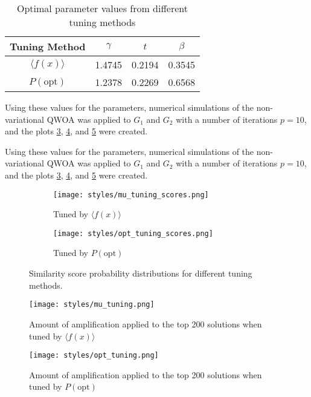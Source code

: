 \begin{table}[ht]
    \centering
    \begin{tabular}{|c|c|c|c|}
        \hline
        Tuning Method & $\gamma$ & $t$ & $\beta$\\
        \hline
        $\langle f(x)\rangle$ & 1.4745 & 0.2194 & 0.3545\\
        \hline
        $P(\text{opt})$ & 1.2378 & 0.2269 & 0.6568\\
        \hline
    \end{tabular}
    \caption{Optimal parameter values from different tuning methods }
    \label{table:1}
\end{table}

Using these values for the parameters, numerical simulations of the non-variational QWOA was applied to $G_{1}$ and $G_{2}$ with a number of iterations $p=10$, and the plots \ref{fig:image1}, \ref{fig:image2}, and \ref{fig:image3} were created.

Using these values for the parameters, numerical simulations of the non-variational QWOA was applied to $G_{1}$ and $G_{2}$ with a number of iterations $p=10$, and the plots \ref{fig:image1}, \ref{fig:image2}, and \ref{fig:image3} were created.

\begin{figure}[ht]
\begin{subfigure}{0.45\textwidth}
\texttt{[image: styles/mu\_tuning\_scores.png]} 
\caption{Tuned by $\langle f(x)\rangle$}
\label{fig:subim1}
\end{subfigure}
\begin{subfigure}{0.45\textwidth}
\texttt{[image: styles/opt\_tuning\_scores.png]}
\caption{Tuned by $P(\text{opt})$}
\label{fig:subim2}
\end{subfigure}
\caption{Similarity score probability distributions for different tuning methods.}
\label{fig:image1}
\end{figure}


\begin{figure}[ht]
\texttt{[image: styles/mu\_tuning.png]} 
\caption{Amount of amplification applied to the top 200 solutions when tuned by $\langle f(x)\rangle$}
\label{fig:image2}
\end{figure}

\begin{figure}[ht]
\texttt{[image: styles/opt\_tuning.png]}
\caption{Amount of amplification applied to the top 200 solutions when tuned by $P(\text{opt})$}
\label{fig:im3}
\label{fig:image3}
\end{figure}

